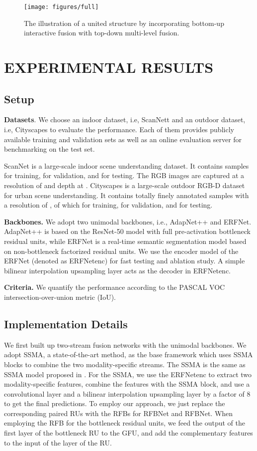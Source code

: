 \documentclass[letterpaper, 10 pt, conference]{ieeeconf}
\begin{document}
	\begin{figure}[!tb]
		\centering
		\texttt{[image: figures/full]}
		\caption{The illustration of a united structure by incorporating bottom-up interactive fusion with top-down multi-level fusion. }
		\label{fig_united}
	\end{figure}
	
	\section{EXPERIMENTAL RESULTS}
	\subsection{Setup}
	\textbf{Datasets}.
	We choose an indoor dataset, i.e, ScanNett\cite{dai2017scannet} and an outdoor dataset, i.e, Cityscapes\cite{cordts2016cityscapes} to evaluate the performance. Each of them provides publicly available training and validation sets as well as an online evaluation server for benchmarking on the test set.
	
	ScanNet is a large-scale indoor scene understanding dataset. It contains  samples for training,  for validation, and  for testing. The RGB images are captured at a resolution of  and depth at . Cityscapes is a large-scale outdoor RGB-D dataset for urban scene understanding. It contains totally  finely annotated samples with a resolution of , of which  for training,  for validation, and  for testing.
	
	\textbf{Backbones.}
	We adopt two unimodal backbones, i.e., AdapNet++\cite{valada2019self} and ERFNet\cite{romera2017erfnet}. AdapNet++ is based on the ResNet-50 model with full pre-activation bottleneck residual units, while ERFNet is a real-time semantic segmentation model based on non-bottleneck factorized residual units. We use the encoder model of the ERFNet (denoted as ERFNetenc) for fast testing and ablation study. A simple bilinear interpolation upsampling layer acts as the decoder in ERFNetenc.
	
	\textbf{Criteria.} We quantify the performance according to the PASCAL VOC intersection-over-union metric (IoU)\cite{everingham2015pascal}.

	\subsection{Implementation Details}
	We first built up two-stream fusion networks with the unimodal backbones. We adopt SSMA\cite{valada2019self}, a state-of-the-art method, as the base framework which uses SSMA blocks to combine the two modality-specific streams. The SSMA is the same as SSMA model proposed in \cite{valada2019self}. For the SSMA, we use the ERFNetenc to extract two modality-specific features, combine the features with the SSMA block, and use a  convolutional layer and a bilinear interpolation upsampling layer by a factor of 8 to get the final predictions. 
	To employ our approach, we just replace the corresponding paired RUs with the RFBs for RFBNet and RFBNet. When employing the RFB for the bottleneck residual units, we feed the output of the first  layer of the bottleneck RU to the GFU, and add the complementary features to the input of the  layer of the RU.
	
\end{document}
